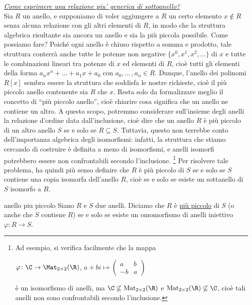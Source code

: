 \noindent\emph{\underline{Come esprimere una relazione piu' generica di sottoanello?}}
\vspace{2mm}\\
Sia $R$ un anello, e supponiamo di voler aggiungere a $R$ un certo elemento $x\notin R$ 
senza alcuna relazione con gli altri elementi di $R$, in modo che la struttura algebrica risultante sia ancora un anello 
e sia la più piccola possibile. Come possiamo fare? 
\vspace{1.5mm}
\noindent Poiché ogni anello è chiuso rispetto a somma e prodotto, tale struttura conterrà anche tutte le potenze non negative 
$\{x^0, x^1, x^2, ...\}$ di $x$ e tutte le combinazioni lineari tra potenze di $x$ ed elementi di $R$, 
cioè tutti gli elementi della forma $a_nx^n + ... + a_1x+a_0$ con $a_0,...\,,a_n\in R$. 
Dunque, l'anello dei polinomi $R[x]$ sembra essere la struttura che soddisfa le nostre richieste, 
cioè il più piccolo anello contenente sia $R$ che $x$. Resta solo da formalizzare meglio il concetto di ``più piccolo anello'', 
cioè chiarire cosa significa che un anello ne contiene un altro.
\vspace{1.5mm}
\noindent A questo scopo, potremmo considerare sull'insieme degli anelli la relazione d'ordine data dall'inclusione, 
cioè dire che un anello $R$ è più piccolo di un altro anello $S$ se e solo se $R\subseteq S$. 
Tuttavia, questo non terrebbe conto dell'importanza algebrica degli isomorfismi: infatti, 
la struttura che stiamo cercando di costruire è definita a meno di isomorfismi, 
e anelli isomorfi potrebbero essere non confrontabili secondo l'inclusione.
\footnote{Ad esempio, si verifica facilmente che la mappa 

$\varphi\colon \C\to \Mat_{2\times 2}(\R)$, $a+bi \mapsto 
\begin{pmatrix} a & b \\ -b & a \end{pmatrix}$ 

è un isomorfismo di anelli, ma 
$\C\not\subseteq \operatorname{Mat}_{2\times 2}(\R)$ e $\operatorname{Mat}_{2\times 2}(\R)\not\subseteq \C$, 
cioè tali anelli non sono confrontabili secondo l'inclusione.} Per risolvere tale problema, 
ha quindi più senso definire che $R$ è più piccolo di $S$ se e solo se $S$ contiene una copia isomorfa dell'anello $R$, 
cioè se e solo se esiste un sottanello di $S$ isomorfo a $R$.
\clearpage

\begin{defn}{anello piu piccolo}
Siano $R$ e $S$ due anelli. Diciamo che $R$ è \underline{più piccolo} di $S$ (o anche che $S$ contiene $R$) 
se e solo se esiste un omomorfismo di anelli iniettivo $\varphi \colon R\to S$.
\end{defn} 

